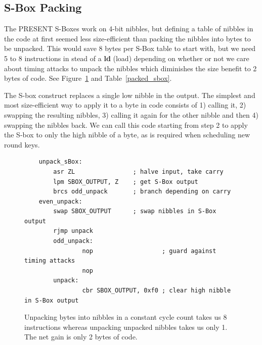 \documentclass[11pt]{llncs2e} %
\begin{document}
\subsection{S-Box Packing}\label{sbox_packing}
The PRESENT S-Boxes work on 4-bit nibbles, but defining a table of nibbles in the code at first seemed less size-efficient than packing the nibbles into bytes to be unpacked.
This would save 8 bytes per S-Box table to start with, but we need 5 to 8 instructions in stead of a \textbf{ld} (load) depending on whether or not we care about timing attacks to unpack the nibbles which diminishes the size benefit to 2 bytes of code. See Figure~\ref{unpacking_code} and Table~\ref{packed_sbox}.

The S-box construct replaces a single low nibble in the output.
The simplest and most size-efficient way to apply it to a byte in code consists of 1) calling it, 2) swapping the resulting nibbles, 3) calling it again for the other nibble and then 4) swapping the nibbles back.
We can call this code starting from step 2 to apply the S-box to only the high nibble of a byte, as is required when scheduling new round keys.

\begin{figure}[H]
\centering
\begin{lstlisting}
	unpack_sBox:
		asr ZL                ; halve input, take carry
		lpm SBOX_OUTPUT, Z    ; get S-Box output
		brcs odd_unpack       ; branch depending on carry
	even_unpack:
		swap SBOX_OUTPUT      ; swap nibbles in S-Box output
		rjmp unpack
        odd_unpack:
                nop                   ; guard against timing attacks
                nop
        unpack:
                cbr SBOX_OUTPUT, 0xf0 ; clear high nibble in S-Box output
	\end{lstlisting}
	\caption{\footnotesize Unpacking bytes into nibbles in a constant cycle count takes us 8 instructions whereas unpacking unpacked nibbles takes us only 1. The net gain is only 2 bytes of code.}
\label{unpacking_code}
\end{figure}
\end{document}
